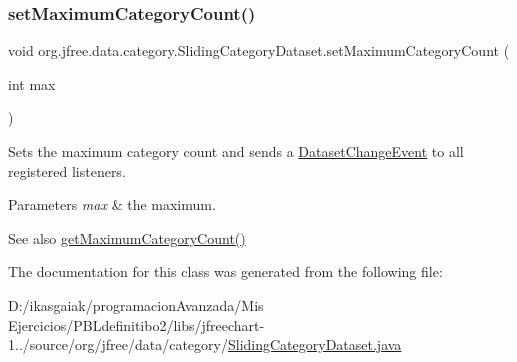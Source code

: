 \subsubsection{\texorpdfstring{set\+Maximum\+Category\+Count()}{setMaximumCategoryCount()}}
{\footnotesize\ttfamily void org.\+jfree.\+data.\+category.\+Sliding\+Category\+Dataset.\+set\+Maximum\+Category\+Count (\begin{DoxyParamCaption}\item[{int}]{max }\end{DoxyParamCaption})}

Sets the maximum category count and sends a \mbox{\hyperlink{}{Dataset\+Change\+Event}} to all registered listeners.


\begin{DoxyParams}{Parameters}
{\em max} & the maximum.\\
\hline
\end{DoxyParams}
\begin{DoxySeeAlso}{See also}
\mbox{\hyperlink{classorg_1_1jfree_1_1data_1_1category_1_1_sliding_category_dataset_aba9d4fd7a8a49f295a2704c0dc1030b3}{get\+Maximum\+Category\+Count()}} 
\end{DoxySeeAlso}


The documentation for this class was generated from the following file\+:\begin{DoxyCompactItemize}
\item 
D\+:/ikasgaiak/programacion\+Avanzada/\+Mis Ejercicios/\+P\+B\+Ldefinitibo2/libs/jfreechart-\/1../source/org/jfree/data/category/\mbox{\hyperlink{_sliding_category_dataset_8java}{Sliding\+Category\+Dataset.\+java}}\end{DoxyCompactItemize}
